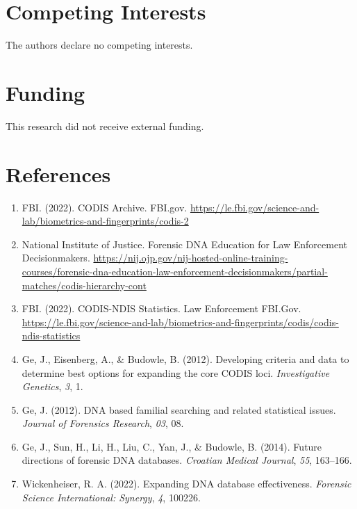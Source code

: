 \documentclass[11pt]{article}
\begin{document}
\section*{Competing Interests}

The authors declare no competing interests.

\section*{Funding}

This research did not receive external funding.

\section*{References}

\begin{enumerate}
\item FBI. (2022). CODIS Archive. FBI.gov. \url{https://le.fbi.gov/science-and-lab/biometrics-and-fingerprints/codis-2}

\item National Institute of Justice. Forensic DNA Education for Law Enforcement Decisionmakers. \url{https://nij.ojp.gov/nij-hosted-online-training-courses/forensic-dna-education-law-enforcement-decisionmakers/partial-matches/codis-hierarchy-cont}

\item FBI. (2022). CODIS-NDIS Statistics. Law Enforcement FBI.Gov. \url{https://le.fbi.gov/science-and-lab/biometrics-and-fingerprints/codis/codis-ndis-statistics}

\item Ge, J., Eisenberg, A., \& Budowle, B. (2012). Developing criteria and data to determine best options for expanding the core CODIS loci. \textit{Investigative Genetics}, \textit{3}, 1. 

\item Ge, J. (2012). DNA based familial searching and related statistical issues. \textit{Journal of Forensics Research}, \textit{03}, 08.

\item Ge, J., Sun, H., Li, H., Liu, C., Yan, J., \& Budowle, B. (2014). Future directions of forensic DNA databases. \textit{Croatian Medical Journal}, \textit{55}, 163--166.

\item Wickenheiser, R. A. (2022). Expanding DNA database effectiveness. \textit{Forensic Science International: Synergy}, \textit{4}, 100226.


\end{enumerate}
\end{document}
